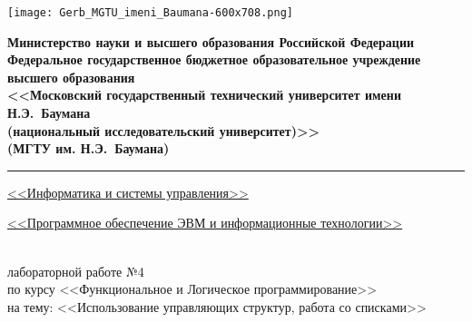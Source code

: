 \clearpage

\thispagestyle{fancy}
\renewcommand{\headrulewidth}{0pt}
\fancyhead{}

{
    \linespread{1}

    \noindent\begin{minipage}{0.12\textwidth}
        \texttt{[image: Gerb\_MGTU\_imeni\_Baumana-600x708.png]}
    \end{minipage}
    \hfill
    \noindent\begin{minipage}{0.83\textwidth}\centering
        \centering
        \small
        \bfseries
        Министерство науки и высшего образования Российской Федерации\\
        Федеральное государственное бюджетное образовательное учреждение высшего образования\\
        <<Московский государственный технический университет имени Н.Э.~Баумана\\
        (национальный исследовательский университет)>>\\
        (МГТУ им. Н.Э.~Баумана)
    \end{minipage}
}

\noindent\rule{\linewidth}{3pt}

{
\small
{} \uline{\hfill<<Информатика и системы управления>>\hfill}

 \uline{\hfill<<Программное обеспечение ЭВМ и информационные технологии>>\hfill}
}

\vspace{7\baselineskip}

\begin{center}
    {\Large{}} \\
    { лабораторной работе №4} \\
    по курсу <<Функциональное и Логическое программирование>> \\
    на тему: <<Использование управляющих структур, работа со списками>> \\
\end{center}

\vspace{6\baselineskip}

